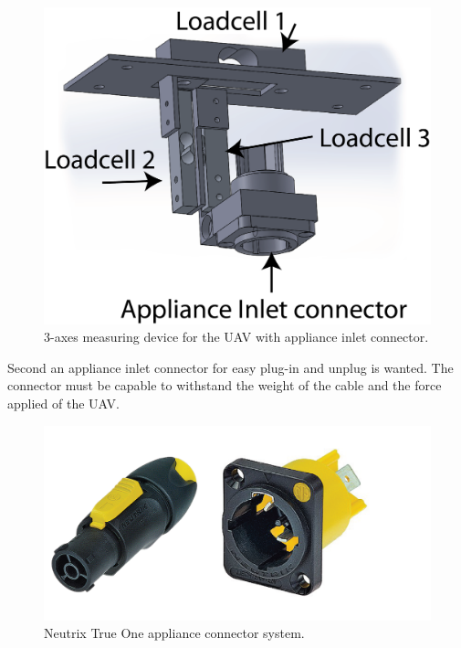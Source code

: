 \begin{figure}[hbtp]
\centering
\includegraphics[scale=0.5]{graphics/cad/hexa.png}
\caption{3-axes measuring device for the UAV with appliance inlet connector.}
\end{figure}


\noindent
Second an appliance inlet connector for easy plug-in and unplug is wanted. The connector must be capable to withstand the weight of the cable and the force applied of the UAV. 

\begin{figure}[hbtp]
\centering
\includegraphics[scale=0.5]{graphics/Neutrix-True-One.png}
\caption{Neutrix True One appliance connector system.}
\end{figure}


